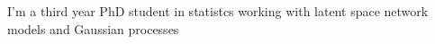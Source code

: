 I'm a third year PhD student in statistcs working with latent space network models and Gaussian processes